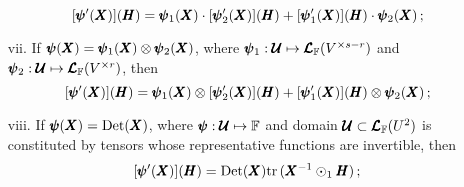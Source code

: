 \begin{itemize}
	\begin{equation}
	[\pmb{\psi}'(\pmb{X})](\pmb{H})=\pmb{\psi}_1(\pmb{X})\cdot[\pmb{\psi}_2'(\pmb{X})](\pmb{H}) + [\pmb{\psi}_1'(\pmb{X})](\pmb{H}) \cdot \pmb{\psi}_2(\pmb{X})\,;
	\end{equation}
	\item[vii.] If $\pmb{\psi}(\pmb{X})=\pmb{\psi}_1(\pmb{X})\otimes\pmb{\psi}_2(\pmb{X})$, where $\pmb{\psi}_1 : \pmb{\mathcal{U}} \mapsto \pmb{\mathcal{L}}_{\mathbb{F}}(V^{\times s-r})$ and $\pmb{\psi}_2 : \pmb{\mathcal{U}} \mapsto \pmb{\mathcal{L}}_{\mathbb{F}}(V^{\times r})$, then
\begin{equation}
[\pmb{\psi}'(\pmb{X})](\pmb{H})=\pmb{\psi}_1(\pmb{X})\otimes[\pmb{\psi}_2'(\pmb{X})](\pmb{H}) + [\pmb{\psi}_1'(\pmb{X})](\pmb{H}) \otimes \pmb{\psi}_2(\pmb{X})\,;
\end{equation}
\item[viii.] If $\pmb{\psi}(\pmb{X})=\textnormal{Det}(\pmb{X})$, where $\pmb{\psi} : \pmb{\mathcal{U}} \mapsto \mathbb{F}$ and domain $\pmb{\mathcal{U}}\subset\pmb{\mathcal{L}}_{\mathbb{F}}(U^2)$ is constituted by tensors whose representative functions are invertible, then
\begin{equation}
[\pmb{\psi}'(\pmb{X})](\pmb{H})=\textnormal{Det}(\pmb{X})\mathrm{tr}\,(\pmb{X}^{-1}\odot_1\pmb{H})\,;
\end{equation}
\end{itemize}
